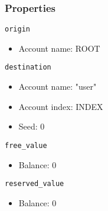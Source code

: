 \documentclass[11pt,a4paper]{article}
\begin{document}
\subsubsection*{Properties}
\verb|origin|
\begin{itemize}
    \item Account name: ROOT
\end{itemize}
\verb|destination|
\begin{itemize}
    \item Account name: "user"
    \item Account index: INDEX
    \item Seed: 0
\end{itemize}
\verb|free_value|
\begin{itemize}
    \item Balance: 0
\end{itemize}
\verb|reserved_value|
\begin{itemize}
    \item Balance: 0
\end{itemize}
\end{document}
